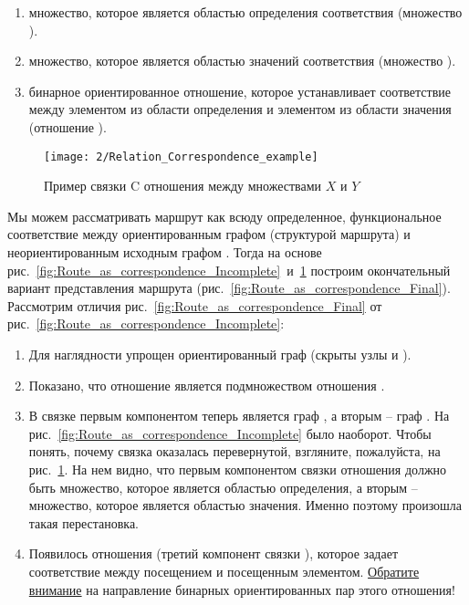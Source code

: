 \begin{enumerate}
\item множество, которое является областью определения соответствия
  (множество ).
\item множество, которое является областью значений соответствия
  (множество ).
\item бинарное ориентированное отношение, которое устанавливает
  соответствие между элементом из области определения и элементом из
  области значения (отношение ).
\end{enumerate}

\begin{figure}[h!]
  \centering
  \texttt{[image: 2/Relation\_Correspondence\_example]}
  \caption{Пример связки C отношения  между
    множествами $X$ и $Y$}
  \label{fig:Relation_Correspondence_example}
\end{figure}

Мы можем рассматривать маршрут  как всюду определенное,
функциональное соответствие между ориентированным графом (структурой
маршрута)  и неориентированным исходным графом .
Тогда на основе
рис.~\ref{fig:Route_as_correspondence_Incomplete}~и~\ref{fig:Relation_Correspondence_example}
построим окончательный вариант представления маршрута 
(рис.~\ref{fig:Route_as_correspondence_Final}). Рассмотрим отличия
рис.~\ref{fig:Route_as_correspondence_Final} от
рис.~\ref{fig:Route_as_correspondence_Incomplete}:

\begin{enumerate}
\item Для наглядности упрощен ориентированный граф  (скрыты
  узлы  и ).
\item Показано, что отношение  является подмножеством
  отношения .
\item В связке  первым компонентом теперь является граф
  , а вторым – граф . На
  рис.~\ref{fig:Route_as_correspondence_Incomplete} было
  наоборот. Чтобы понять, почему связка оказалась перевернутой,
  взгляните, пожалуйста, на
  рис.~\ref{fig:Relation_Correspondence_example}. На нем видно, что
  первым компонентом связки отношения  должно быть
  множество, которое является областью определения, а вторым –
  множество, которое является областью значения. Именно поэтому
  произошла такая перестановка.
\item Появилось отношения (третий компонент связки ), которое
  задает соответствие между посещением и посещенным
  элементом. \underline{Обратите внимание} на направление бинарных
  ориентированных пар этого отношения!
\end{enumerate}

